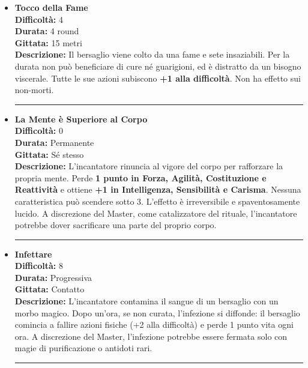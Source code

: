 \documentclass[./magie.tex]{subfiles}
\begin{document}
\begin{itemize}
\vspace{0.5cm}\rule{\textwidth}{0.4pt}\vspace{1cm}

\item \textbf{Tocco della Fame} \\
\textbf{Difficoltà:} 4 \\
\textbf{Durata:} 4 round \\
\textbf{Gittata:} 15 metri \\
\textbf{Descrizione:} Il bersaglio viene colto da una fame e sete insaziabili. Per la durata non può beneficiare di cure né guarigioni, ed è distratto da un bisogno viscerale. Tutte le sue azioni subiscono \textbf{+1 alla difficoltà}. Non ha effetto sui non-morti.

\vspace{0.5cm}\rule{\textwidth}{0.4pt}\vspace{1cm}
\clearpage
\item \textbf{La Mente è Superiore al Corpo} \\
\textbf{Difficoltà:} 0 \\
\textbf{Durata:} Permanente \\
\textbf{Gittata:} Sé stesso \\
\textbf{Descrizione:} L'incantatore rinuncia al vigore del corpo per rafforzare la propria mente. Perde \textbf{1 punto in Forza, Agilità, Costituzione e Reattività} e ottiene \textbf{+1 in Intelligenza, Sensibilità e Carisma}. Nessuna caratteristica può scendere sotto 3. L’effetto è irreversibile e spaventosamente lucido. A discrezione del Master, come catalizzatore del rituale, l'incantatore potrebbe dover sacrificare una parte del proprio corpo.

\vspace{0.5cm}\rule{\textwidth}{0.4pt}\vspace{1cm}

\item \textbf{Infettare} \\
\textbf{Difficoltà:} 8 \\
\textbf{Durata:} Progressiva \\
\textbf{Gittata:} Contatto \\
\textbf{Descrizione:} L'incantatore contamina il sangue di un bersaglio con un morbo magico. Dopo un’ora, se non curata, l’infezione si diffonde: il bersaglio comincia a fallire azioni fisiche (+2 alla difficoltà) e perde 1 punto vita ogni ora. A discrezione del Master, l'infezione potrebbe essere fermata solo con magie di purificazione o antidoti rari.

\vspace{0.5cm}\rule{\textwidth}{0.4pt}\vspace{1cm}

\end{itemize}
\end{document}
